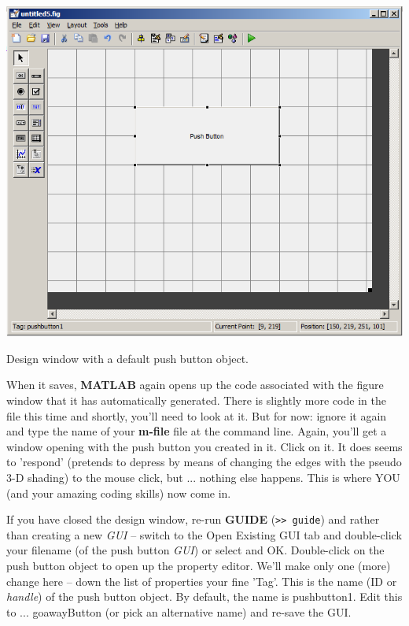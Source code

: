 \documentclass{tufte-book} %
\begin{document}
\begin{marginfigure}[0.0in]
\includegraphics[width=\linewidth]{chGUI-PushButton.png}
\caption{Design window with a default push button object.}
\label{fig:chGUI-PushButton}
\end{marginfigure}

When it saves, \textbf{MATLAB} again opens up the code associated with the figure window that it has automatically generated. There is slightly more code in the file this time and shortly, you'll need to look at it. But for now: ignore it again and type the name of your \textbf{m-file} file at the command line. Again, you'll get a window opening with the push button you created in it. Click on it. It does seems to 'respond' (pretends to depress by means of changing the edges with the pseudo 3-D shading) to the mouse click, but ... nothing else happens. This is where YOU (and your amazing coding skills) now come in.

If you have closed the design window, re-run \textbf{GUIDE} (\texttt{\textgreater\textgreater\ guide}) and rather than creating a new \textit{GUI} -- switch to the \textsf{Open Existing GUI} tab and double-click your filename (of the push button \textit{GUI}) or select and OK. Double-click on the push button object to open up the property editor. We'll make only one (more) change here -- down the list of properties your fine '\textsf{Tag}'. This is the name (ID or \textit{handle}) of the push button object. By default, the name is \textsf{pushbutton1}. Edit this to ... \textsf{goawayButton} (or pick an alternative name) and re-save the GUI.
\end{document}
